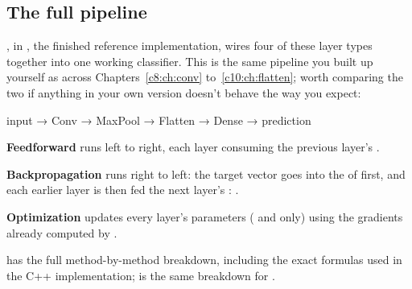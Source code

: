 \subsection{The full pipeline}
\label{c10:sec:pipeline}
, in , the finished reference implementation, wires
four of these layer types together into one working classifier. This is the same pipeline you built
up yourself as  across Chapters~\ref{c8:ch:conv} to~\ref{c10:ch:flatten}; worth
comparing the two if anything in your own version doesn't behave the way you expect:

\begin{console}
input → Conv → MaxPool → Flatten → Dense → prediction
\end{console}

\noindent\textbf{Feedforward} runs left to right, each layer consuming the previous layer's
.

\textbf{Backpropagation} runs right to left: the target vector goes into the 
of  first, and each earlier layer is then fed the next layer's
: .

\textbf{Optimization} updates every layer's parameters ( and  only) using the
gradients already computed by .

 has the full method-by-method breakdown, including the exact
formulas used in the C++ implementation;  is the same breakdown for
.
